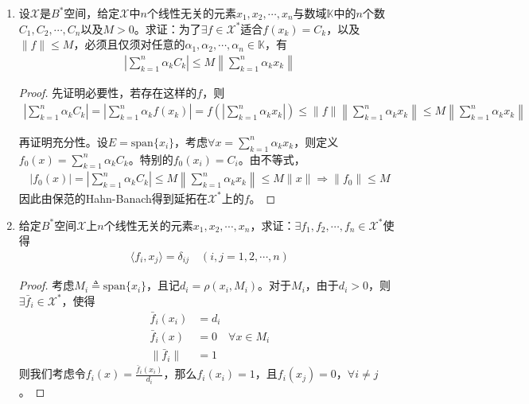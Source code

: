 \begin{enumerate}[leftmargin=2cm, label=\arabic*]
    \item 设$\mathscr{X}$是$B^*$空间，给定$\mathscr{X}$中$n$个线性无关的元素$x_1,x_2,\cdots,x_n$与数域$\mathbb{K}$中的$n$个数$C_1,C_2,\cdots,C_n$以及$M>0$。求证：为了$\exists f\in\mathscr{X}^*$适合$f(x_k)= C_k$，以及$\|f\|\leqslant M$，必须且仅须对任意的$\alpha_1,\alpha_2,\cdots,\alpha_n\in\mathbb{K}$，有
    \begin{align*}
        \left|\sum\limits_{k=1}^n \alpha_k C_k \right| \leqslant M \left\| \sum\limits_{k=1}^n \alpha_k x_k  \right\|
    \end{align*}
    \begin{proof}
        先证明必要性，若存在这样的$f$，则
        \begin{align*}
             \left|\sum\limits_{k=1}^n \alpha_k C_k \right| =  \left|\sum\limits_{k=1}^n \alpha_k f(x_k) \right| = f\left(\left|\sum\limits_{k=1}^n \alpha_k x_k \right| \right) \leqslant \|f\| \left\|\sum\limits_{k=1}^n \alpha_k x_k \right\| \leqslant M \left\| \sum\limits_{k=1}^n \alpha_k x_k  \right\|
        \end{align*}

        再证明充分性。设$E = \text{span}\{x_i\}$，考虑$\forall x = \sum\limits_{k=1}^n \alpha_k x_k$，则定义$f_0(x) = \sum\limits_{k=1}^n \alpha_k C_k$。特别的$f_0(x_i) = C_i$。由不等式，
        \begin{align*}
            |f_0(x)| = \left|\sum\limits_{k=1}^n \alpha_k C_k \right| \leqslant M \left\| \sum\limits_{k=1}^n \alpha_k x_k  \right\| \leqslant M\|x\| \Rightarrow \|f_0\| \leqslant M
        \end{align*}
        因此由保范的Hahn-Banach得到延拓在$\mathscr{X}^*$上的$f$。
    \end{proof}

    \item 给定$B^*$空间$\mathscr{X}$上$n$个线性无关的元素$x_1,x_2,\cdots,x_n$，求证：$\exists f_1,f_2,\cdots,f_n\in\mathscr{X}^*$使得
    \begin{align*}
        \langle f_i, x_j\rangle = \delta_{ij} \quad (i,j = 1,2,\cdots,n)
    \end{align*}
    \begin{proof}
        考虑$M_i\triangleq \text{span}\{x_i\}$，且记$d_i = \rho(x_i,M_i)$。对于$M_i$，由于$d_i>0$，则$\exists \bar{f}_i\in\mathscr{X}^*$，使得
        \begin{align*}
            \bar{f}_i(x_i) &= d_i \\
            \bar{f}_i(x) &= 0 \quad \forall x\in M_i \\
            \|\bar{f}_i\| &= 1
        \end{align*}
        则我们考虑令$f_i(x) = \frac{\bar{f}_i(x_i)}{d_i}$，那么$f_i(x_i) = 1$，且$f_i(x_j) = 0$，$\forall i\neq j$。
    \end{proof}


\end{enumerate}
